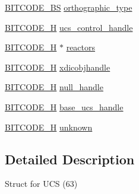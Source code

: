 \begin{DoxyCompactItemize}
\item 
\hyperlink{dwg_8h_a94297606fbd4a4ff97e8add284af0809}{\-B\-I\-T\-C\-O\-D\-E\-\_\-\-B\-S} \hyperlink{struct__dwg__object__UCS_a694d7e7bbb8f11faa7535a20c387aeb7}{orthographic\-\_\-type}
\item 
\hyperlink{dwg_8h_a7c700e94e047a97ba8c24bdfe4029dc3}{\-B\-I\-T\-C\-O\-D\-E\-\_\-\-H} \hyperlink{struct__dwg__object__UCS_adf810ae7cb404c23ae2e45fb569ac974}{ucs\-\_\-control\-\_\-handle}
\item 
\hyperlink{dwg_8h_a7c700e94e047a97ba8c24bdfe4029dc3}{\-B\-I\-T\-C\-O\-D\-E\-\_\-\-H} $\ast$ \hyperlink{struct__dwg__object__UCS_a428c547623ae31b5d22743ce6d5a6329}{reactors}
\item 
\hyperlink{dwg_8h_a7c700e94e047a97ba8c24bdfe4029dc3}{\-B\-I\-T\-C\-O\-D\-E\-\_\-\-H} \hyperlink{struct__dwg__object__UCS_a6a7037dd96be1b4856ae3f3baf94a7c4}{xdicobjhandle}
\item 
\hyperlink{dwg_8h_a7c700e94e047a97ba8c24bdfe4029dc3}{\-B\-I\-T\-C\-O\-D\-E\-\_\-\-H} \hyperlink{struct__dwg__object__UCS_adec00cc6da867e5f4ea50eaea2665941}{null\-\_\-handle}
\item 
\hyperlink{dwg_8h_a7c700e94e047a97ba8c24bdfe4029dc3}{\-B\-I\-T\-C\-O\-D\-E\-\_\-\-H} \hyperlink{struct__dwg__object__UCS_abb5d5666c2e3898e21b4d4f22ce0ecbf}{base\-\_\-ucs\-\_\-handle}
\item 
\hyperlink{dwg_8h_a7c700e94e047a97ba8c24bdfe4029dc3}{\-B\-I\-T\-C\-O\-D\-E\-\_\-\-H} \hyperlink{struct__dwg__object__UCS_a9525370a917a842dea9b4b7342150337}{unknown}
\end{DoxyCompactItemize}


\subsection{\-Detailed \-Description}
\-Struct for \-U\-C\-S (63) 

